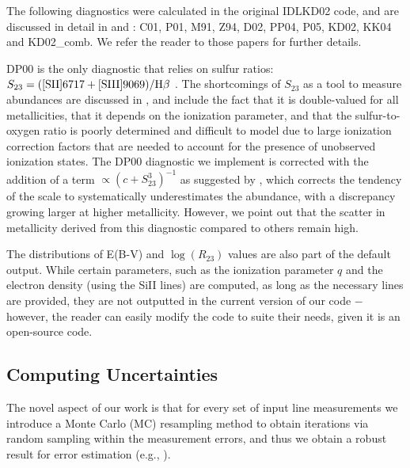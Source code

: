 \documentclass{emulateapj}
\begin{document}
The following diagnostics were calculated in the original IDLKD02 code, and are discussed in detail in \citet{kewley02} and \citet{kewley08}: C01, P01, M91, Z94, D02, PP04, P05, KD02, KK04 and KD02\_comb. We refer the reader to those papers for further details.

DP00 is the only diagnostic that relies on sulfur ratios: $ S_{23}= {\rm ( [SII]6717+[SIII]9069) } / {\rm H}\beta $ . The shortcomings of $S_{23}$ as a tool to measure abundances are discussed in \citet{kewley02}, and include the fact that it is double-valued for all metallicities, that it depends on the ionization parameter, and that the sulfur-to-oxygen ratio is poorly determined and difficult to model due to large ionization correction factors that are needed to account for the presence of unobserved ionization states. The DP00 diagnostic we implement is corrected with the addition of a term $\propto (c+S_{23}^3)^{-1}$ as suggested by \citet{kewley02}, which corrects the tendency of the scale to systematically underestimates the abundance, with a discrepancy growing larger at higher metallicity. However, we point out that the scatter in metallicity derived from this diagnostic compared to others remain high. 


The distributions of E(B-V) and $\log(R_{23})$ values are also part of the default output. While certain parameters, such as the ionization parameter $q$ and the electron density (using the SiII lines) are computed, as long as the necessary lines are provided, they are not outputted in the current version of our code $-$ however, the reader can easily modify the code to suite their needs, given it is an open-source code.



\subsection{Computing Uncertainties}\label{sec:uncert}
The novel aspect of our work is that for every set of input line measurements we introduce a Monte Carlo (MC) resampling method to obtain iterations via random sampling within the measurement errors, and thus we obtain a robust result for error estimation (e.g., \citealt{efron79,hastie09,andrae10}). 
\end{document}
